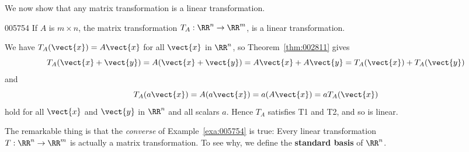 We now show that any matrix transformation is a linear transformation. 

\begin{example}{}{005754}
If $A$ is $m \times n$, the matrix transformation $T_{A} : \RR^n \to \RR^m$, is a linear transformation.

\begin{solution}
  We have $T_{A}(\vect{x}) = A\vect{x}$ for all $\vect{x}$ in $\RR^n$, so Theorem~\ref{thm:002811} gives
\begin{equation*}
T_{A}(\vect{x} + \vect{y}) = A(\vect{x} + \vect{y}) = A\vect{x} + A\vect{y} = T_{A}(\vect{x}) + T_{A}(\vect{y})
\end{equation*}
and
\begin{equation*}
T_{A}(a\vect{x}) = A(a\vect{x}) = a(A\vect{x}) = aT_{A}(\vect{x})
\end{equation*}
hold for all $\vect{x}$ and $\vect{y}$ in $\RR^n$ and all scalars $a$. Hence $T_{A}$ satisfies T1 and T2, and so is linear.
\end{solution}
\end{example}

The remarkable thing is that the \textit{converse} of Example~\ref{exa:005754} is true: Every linear transformation \\ $T : \RR^n \to \RR^m$ is actually a matrix transformation. To see why, we define the \textbf{standard basis} of $\RR^n$. 


